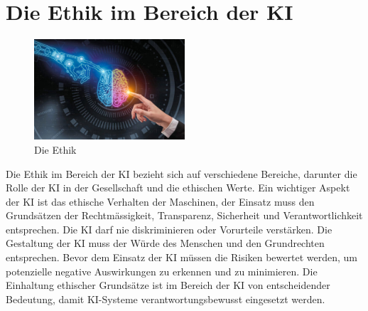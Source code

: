 \chapter{Die Ethik im Bereich der KI}
\label{chap:Die Ethik }

\begin{figure}[h]
    \centering
    \includegraphics[width=0.5\textwidth]{KI4.jpg} 
    \caption{Die Ethik}
    \label{fig:ai}
\end{figure}

Die Ethik im Bereich der KI bezieht sich auf verschiedene Bereiche, darunter die Rolle der KI in der Gesellschaft und die ethischen Werte. Ein wichtiger Aspekt der KI ist das ethische Verhalten der Maschinen, der Einsatz muss den Grundsätzen der Rechtmässigkeit, Transparenz, Sicherheit und Verantwortlichkeit entsprechen. Die KI darf nie diskriminieren oder Vorurteile verstärken. Die Gestaltung der KI muss der Würde des Menschen und den Grundrechten entsprechen. Bevor dem Einsatz der KI müssen die Risiken bewertet werden, um potenzielle negative Auswirkungen zu erkennen und zu minimieren. Die Einhaltung ethischer Grundsätze ist im Bereich der KI von entscheidender Bedeutung, damit KI-Systeme verantwortungsbewusst eingesetzt werden.